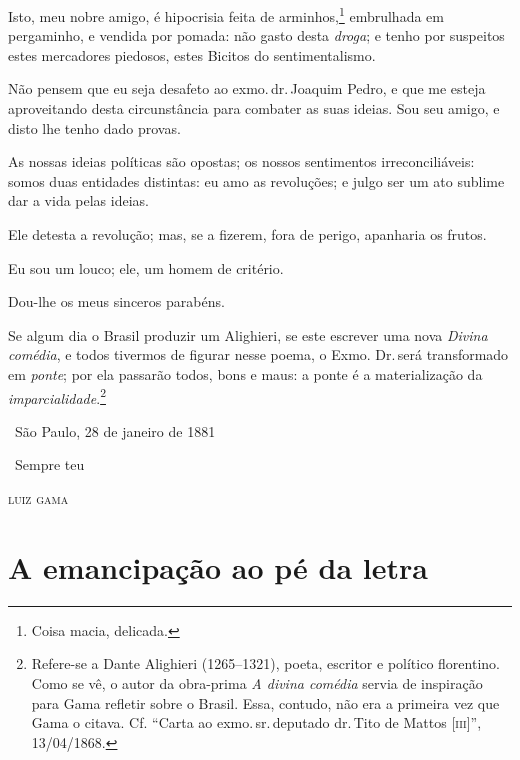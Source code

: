 Isto, meu nobre amigo, é hipocrisia feita de arminhos,\footnote{Coisa
  macia, delicada.} embrulhada em pergaminho, e vendida por pomada: não
gasto desta \emph{droga}; e tenho por suspeitos estes mercadores
piedosos, estes Bicitos do sentimentalismo.

Não pensem que eu seja desafeto ao exmo.\,dr.\,Joaquim Pedro, e que me
esteja aproveitando desta circunstância para combater as suas ideias.
Sou seu amigo, e disto lhe tenho dado provas.

As nossas ideias políticas são opostas; os nossos sentimentos
irreconciliáveis: somos duas entidades distintas: eu amo as revoluções;
e julgo ser um ato sublime dar a vida pelas ideias.

Ele detesta a revolução; mas, se a fizerem, fora de perigo, apanharia os
frutos.

Eu sou um louco; ele, um homem de critério.

Dou-lhe os meus sinceros parabéns.

Se algum dia o Brasil produzir um Alighieri, se este escrever uma nova 
\emph{Divina comédia}, e todos tivermos de figurar nesse poema, o Exmo.
Dr.\,será transformado em \emph{ponte}; por ela passarão todos, bons e
maus: a ponte é a materialização da \emph{imparcialidade}.\footnote{
  Refere-se a Dante Alighieri (1265--1321), poeta, escritor e político
  florentino. Como se vê, o autor da obra-prima \emph{A divina
  comédia} servia de inspiração para Gama refletir sobre o Brasil.
  Essa, contudo, não era a primeira vez que Gama o citava. Cf.
  ``Carta ao exmo.\,sr.\,deputado dr.\,Tito de Mattos {[}\textsc{iii}{]}'',
  13/04/1868.}

\medskip

\hfill\ São Paulo, 28 de janeiro de 1881

\hfill\ Sempre teu

\hfill\textsc{luiz gama}

\part{A emancipação ao pé da letra}

